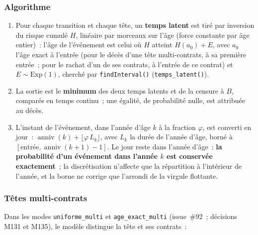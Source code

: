 \documentclass[a4paper,11pt]{article}
\newcommand{\code}[1]{\texttt{\small #1}}
\begin{document}
\subsubsection*{Algorithme}

\begin{enumerate}[leftmargin=*, itemsep=2pt]
  \item Pour chaque transition et chaque tête, un \textbf{temps latent} est
    tiré par inversion du risque cumulé $H$, linéaire par morceaux sur l'âge
    (force constante par âge entier)~: l'âge de l'événement est celui où $H$
    atteint $H(a_0) + E$, avec $a_0$ l'âge exact à l'entrée (pour le décès
    d'une tête multi-contrats, à sa première entrée~; pour le rachat d'un de
    ses contrats, à l'entrée de ce contrat) et
    $E \sim \mathrm{Exp}(1)$, cherché par \code{findInterval()}
    (\code{temps\_latent()}).
  \item La sortie est le \textbf{minimum} des deux temps latents et de la
    censure à $B$, comparés en temps continu~; une égalité, de probabilité
    nulle, est attribuée au décès.
  \item L'instant de l'événement, dans l'année d'âge $k$ à la fraction
    $\varphi$, est converti en jour~: $\operatorname{anniv}(k) +
    \lfloor \varphi\, L_k \rfloor$, avec $L_k$ la durée de l'année d'âge,
    borné à $[\text{entrée}, \operatorname{anniv}(k+1) - 1]$. Le jour reste
    dans l'année d'âge~: \textbf{la probabilité d'un événement dans l'année $k$
    est conservée exactement}~; la discrétisation n'affecte que la
    répartition à l'intérieur de l'année, et la borne ne corrige que
    l'arrondi de la virgule flottante.
\end{enumerate}

\subsubsection*{Têtes multi-contrats}

Dans les modes \code{uniforme\_multi} et \code{age\_exact\_multi} (issue~\#92~;
décisions M131 et M135), le modèle distingue la tête et ses contrats~:
\end{document}
